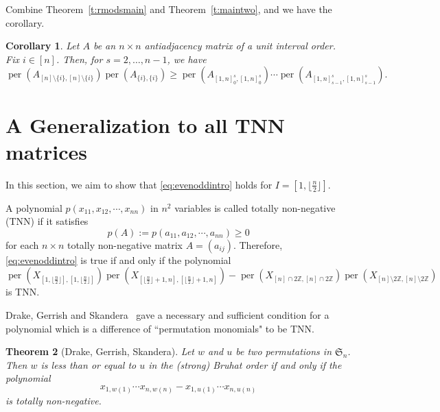 \documentclass[12pt]{amsart}
\newtheorem{thm}{Theorem}[section]
\newtheorem{cor}[thm]{Corollary}
\theoremstyle{definition}
\numberwithin{equation}{section}
\newcommand{\sn}{\mathfrak{S}_n}
\newcommand{\defeq}{:=}
\DeclareMathOperator{\perm}{per}
\begin{document}
Combine Theorem~\ref{t:rmodsmain} and Theorem~\ref{t:maintwo}, and we have the corollary.
\begin{cor}
    Let $A$ be an $n\times n$ antiadjacency matrix of a unit interval order. Fix $i \in [n]$. Then, for $s=2,\dotsc,n-1$, we have \begin{equation*}
        \perm(A_{[n]\setminus\{i\},[n]\setminus\{i\}})\perm(A_{\{i\},\{i\}}) \geq \perm(A_{[1,n]_0^s,[1,n]_0^s})\cdots \perm(A_{[1,n]_{s-1}^s,[1,n]_{s-1}^s}).
    \end{equation*}
\end{cor}

\section{A Generalization to all TNN matrices}\label{s:A gen on all}

In this section, we aim to show that \eqref{eq:evenoddintro} holds for $I = [1,\lfloor \frac{n}{2} \rfloor]$.

A polynomial $p(x_{11}, x_{12},\cdots, x_{nn})$ in $n^2$ variables is called totally non-negative (TNN) if it satisfies
\begin{equation}\label{eq:TNNpolydef}
    p(A)\defeq p(a_{11}, a_{12},\cdots, a_{nn}) \geq 0
\end{equation}
for each $n\times n$ totally non-negative matrix $A=(a_{ij})$. Therefore, \eqref{eq:evenoddintro} is true if and only if the polynomial \begin{equation}\label{TNNpoly}
    \perm(X_{[1,\lfloor \frac{n}{2} \rfloor],[1,\lfloor \frac{n}{2} \rfloor]}) \perm(X_{[\lfloor \frac{n}{2} \rfloor +1,n],[\lfloor \frac{n}{2} \rfloor +1,n]}) - \perm(X_{[n]\cap 2\mathbb Z , [n]\cap 2\mathbb Z})\perm(X_{[n]\setminus 2\mathbb Z , [n]\setminus 2\mathbb Z})
\end{equation} is TNN.

Drake, Gerrish and Skandera~\cite{DGSBruhat} gave a necessary and sufficient condition for a polynomial which is a difference of ``permutation monomials" to be TNN.

\begin{thm}[Drake, Gerrish, Skandera]\label{pairing test}
            Let $w$ and $u$ be two permutations in $\sn$. Then $w$ is less than or equal to $u$ in the (strong) Bruhat order if and only if the polynomial \[x_{1,w(1)} \cdots x_{n,w(n)} - x_{1,u(1)} \cdots x_{n,u(n)}\] is totally non-negative.
\end{thm}
\end{document}
